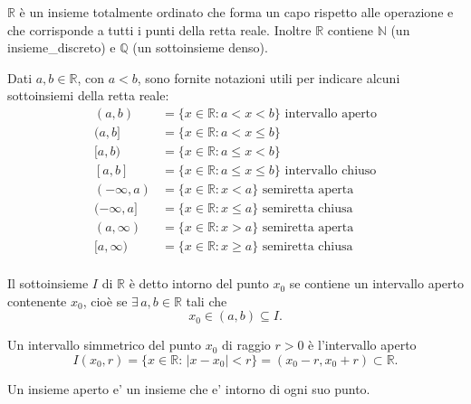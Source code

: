 $\mathbb{R}$ è un insieme totalmente ordinato che forma un capo rispetto alle operazione e che corrisponde a tutti i punti della retta reale. Inoltre $\mathbb{R}$ contiene $\mathbb{N}$ (un \gls{insieme_discreto}) e $\mathbb{Q}$ (un sottoinsieme denso).

Dati $a,b\in\mathbb{R}$, con $a<b$, sono fornite notazioni utili per indicare alcuni sottoinsiemi della retta reale:
\begin{align*}
    (a,b) &= \{x\in\mathbb{R}:a<x<b\}\text{ intervallo aperto}\\
    (a,b] &= \{x\in\mathbb{R}:a<x\leq b\}\\
    [a,b) &= \{x\in\mathbb{R}:a\leq x<b\}\\
    [a, b] &= \{x\in\mathbb{R}:a\leq x\leq b\}\text{ intervallo chiuso}\\
    (-\infty,a) &= \{x\in\mathbb{R}:x<a\}\text{ semiretta aperta}\\
    (-\infty,a] &= \{x\in\mathbb{R}:x\leq a\}\text{ semiretta chiusa}\\
    (a, \infty) &= \{x\in\mathbb{R}:x>a\}\text{ semiretta aperta}\\
    [a, \infty) &= \{x\in\mathbb{R}:x\geq a\}\text{ semiretta chiusa}\\
\end{align*}

\begin{definition}\label{def:intorno}
    Il sottoinsieme $I$ di $\mathbb{R}$ è detto intorno del punto $x_0$ se contiene un intervallo aperto contenente $x_0$, cioè se $\exists\, a,b\in\mathbb{R}$ tali che
    \begin{equation*}
        x_0\in(a,b)\subseteq I.
    \end{equation*}
\end{definition}

\begin{definition}\label{def:intorno_simmetrico}
    Un intervallo simmetrico del punto $x_0$ di raggio $r>0$ è l'intervallo aperto
    \begin{equation}\label{eq:intorno_simmetrico}
        I(x_0,r)=\{x\in\mathbb R\colon\,|x-x_0|<r\}=(x_0 - r, x_0 + r)\subset\mathbb R.
    \end{equation}
\end{definition}

\begin{definition}
    Un insieme aperto e' un insieme che e' intorno di ogni suo punto.
\end{definition}

